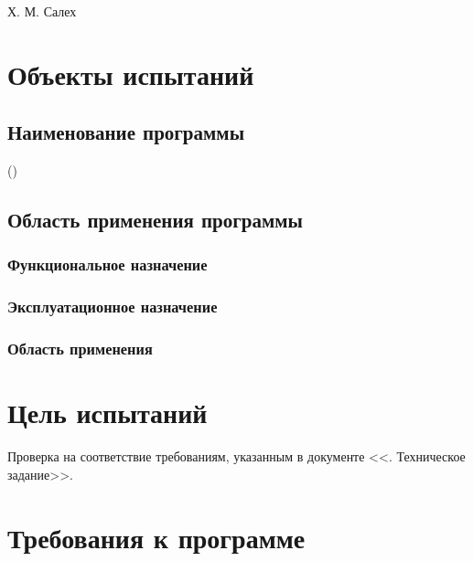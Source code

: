 \documentclass[a4paper,12pt,reqno]{article}
\begin{document}
	
	
	
	

	{Х. М. Салех}
	
	\firstPage
						\newpage
	\secondPage
						\newpage
	\thirdPage
						\newpage
						
						
	\section{Объекты испытаний}
	\subsection{Наименование программы}
	 ()
	\subsection{Область применения программы}
	\subsubsection{Функциональное назначение}
	
	\subsubsection{Эксплуатационное назначение}
	
	\subsubsection{Область применения}
	
					\newpage
					
	\section{Цель испытаний}
	Проверка на соответствие требованиям, указанным в документе <<. Техническое задание>>.
	
	\section{Требования к программе}
\end{document}
